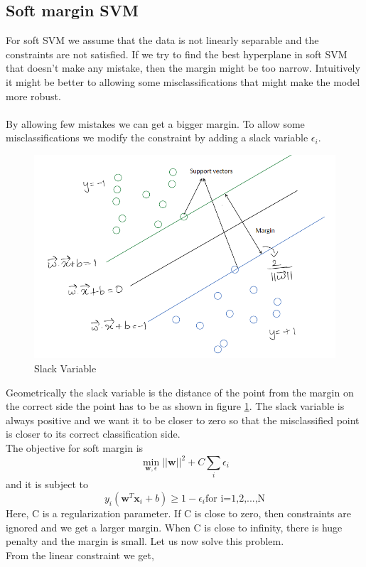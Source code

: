 \documentclass[11pt]{article}
\begin{document}
\subsection{Soft margin SVM}
For soft SVM we assume that the data is not linearly separable and the constraints are not satisfied. If we try to find the best hyperplane in soft SVM that doesn't make any mistake, then the margin might be too narrow. Intuitively it might be better to allowing some misclassifications that might make the model more robust. \\ \\
By allowing few mistakes we can get a bigger margin. To allow some misclassifications we modify the constraint by adding a slack variable $\epsilon_i$. 
\begin{figure}[h!]
    \centering
  \includegraphics[scale=0.7]{fig4.PNG}
  \caption{Slack Variable}
  \label{fig:SV}
\end{figure}
Geometrically the slack variable is the distance of the point from the margin on the correct side the point has to be as shown in figure \ref{fig:SV}. The slack variable is always positive and we want it to be closer to zero so that the misclassified point is closer to its correct classification side. 
\\The objective for soft margin is \[ \min_{\mathbf{w},\epsilon}||\mathbf{w}||^2 + C\sum_i \epsilon_i \] and it is subject to \[ y_i(\mathbf{w}^{T}\mathbf{x}_i+b)\geq 1-\epsilon_i \text{for i=1,2,...,N}\]
Here, C is a regularization parameter. If C is close to zero, then constraints are ignored and we get a larger margin. When C is close to infinity, there is huge penalty and the margin is small. Let us now solve this problem. \\From the linear constraint we get,
\end{document}
